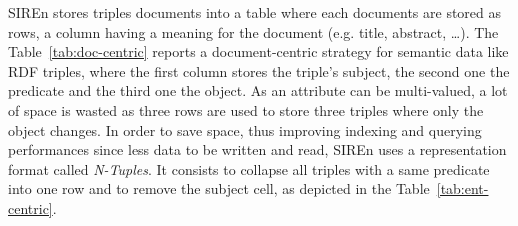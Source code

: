 \begin{table}
\centering
{}%
\caption{Entity-centric indexing on ``The Lord of the Rings'' RDF graph of
Figure~\ref{fig:rdf-graph}. Each entity is reported with its star graph in the
N-Triples format.}
\label{tab:TLR-ent-cent}
\end{table}

SIREn stores triples documents into a table where each
documents are stored as rows, a column having a meaning for the
document (e.g. title, abstract, \ldots). The Table~\ref{tab:doc-centric}
reports a document-centric strategy for semantic data like RDF triples, where
the first column stores the triple's subject, the second one the predicate and
the third one the object. As an attribute can be multi-valued, a lot of space is
wasted as three rows are used to store three triples where only the object
changes. In order to save space, thus improving indexing and querying
performances since less data to be written and read, SIREn uses a
representation format called \emph{N-Tuples}. It consists to collapse all
triples with a same predicate into one row and to remove the subject cell, as
depicted in the Table~\ref{tab:ent-centric}.


